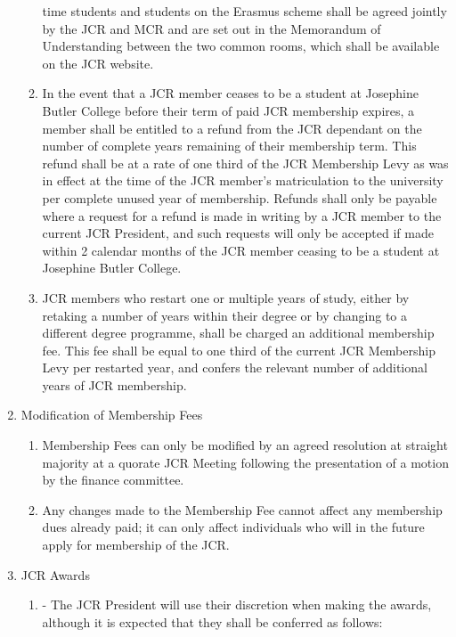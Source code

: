 \begin{enumerate}
\begin{enumerate}
        time students and students on the Erasmus scheme shall be agreed jointly by the JCR and MCR
        and are set out in the Memorandum of Understanding between the two common rooms, which
        shall be available on the JCR website.
        \item In the event that a JCR member ceases to be a student at Josephine Butler College before their
        term of paid JCR membership expires, a member shall be entitled to a refund from the JCR
        dependant on the number of complete years remaining of their membership term. This refund
        shall be at a rate of one third of the JCR Membership Levy as was in effect at the time of the JCR
        member’s matriculation to the university per complete unused year of membership. Refunds shall
        only be payable where a request for a refund is made in writing by a JCR member to the current
        JCR President, and such requests will only be accepted if made within 2 calendar months of the
        JCR member ceasing to be a student at Josephine Butler College.
        \item JCR members who restart one or multiple years of study, either by retaking a number of years
        within their degree or by changing to a different degree programme, shall be charged an
        additional membership fee. This fee shall be equal to one third of the current JCR Membership
        Levy per restarted year, and confers the relevant number of additional years of JCR membership.
    \end{enumerate}
    \item Modification of Membership Fees
    \label{it: Modification of Membership Fees}
    \begin{enumerate}
        \item Membership Fees can only be modified by an agreed resolution at straight majority at a quorate JCR Meeting following the presentation of a motion by the finance committee.
        \item Any changes made to the Membership Fee cannot affect any membership dues already paid; it
        can only affect individuals who will in the future apply for membership of the JCR.
    \end{enumerate}
    \item JCR Awards
    \begin{enumerate}
        \item -	The JCR President will use their discretion when making the awards, although it is expected that they shall be conferred as follows:

\end{enumerate}
\end{enumerate}
